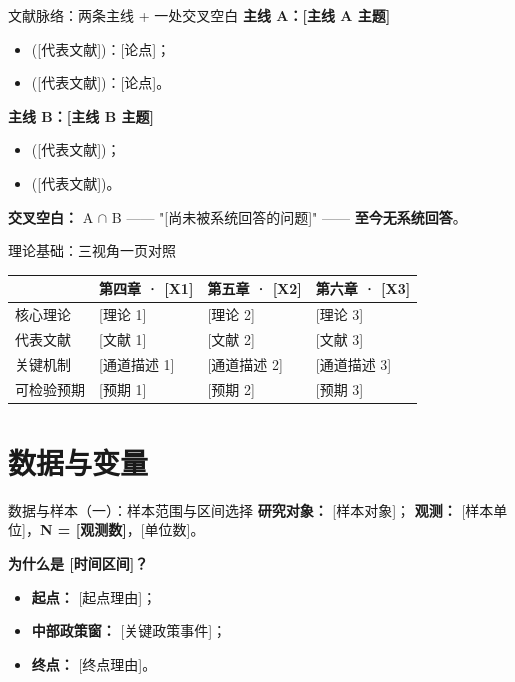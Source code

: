 \documentclass[10pt,aspectratio=169]{beamer}
\begin{document}
\begin{frame}{文献脉络：两条主线 + 一处交叉空白}
  \textbf{主线 A：[主线 A 主题]}
  \begin{itemize}
    \item [派别 1] ([代表文献])：[论点]；
    \item [派别 2] ([代表文献])：[论点]。
  \end{itemize}

  \vspace{0.3em}
  \textbf{主线 B：[主线 B 主题]}
  \begin{itemize}
    \item [路径 1] ([代表文献])；
    \item [路径 2] ([代表文献])。
  \end{itemize}

  \vspace{0.3em}
  \textbf{交叉空白：} A $\cap$ B —— "[尚未被系统回答的问题]" —— \textbf{至今无系统回答}。
\end{frame}

\begin{frame}{理论基础：三视角一页对照}
  \centering\scriptsize
  \setlength{\tabcolsep}{4pt}
  \begin{tabular}{p{1.8cm} p{3.1cm} p{3.1cm} p{3.1cm}}
    \toprule
              & \textbf{第四章 · [X1]} & \textbf{第五章 · [X2]} & \textbf{第六章 · [X3]} \\
    \midrule
    核心理论 & [理论 1]      & [理论 2]      & [理论 3]      \\
    代表文献 & [文献 1]      & [文献 2]      & [文献 3]      \\
    关键机制 & [通道描述 1]  & [通道描述 2]  & [通道描述 3]  \\
    可检验预期 & [预期 1]    & [预期 2]      & [预期 3]      \\
    \bottomrule
  \end{tabular}
\end{frame}

\section{数据与变量}

\begin{frame}{数据与样本（一）：样本范围与区间选择}
  \textbf{研究对象：} [样本对象]；\quad
  \textbf{观测：} [样本单位]，\textbf{N = [观测数]}，[单位数]。

  \vspace{0.4em}
  \textbf{为什么是 [时间区间]？}
  \begin{itemize}
    \item \textbf{起点：} [起点理由]；
    \item \textbf{中部政策窗：} [关键政策事件]；
    \item \textbf{终点：} [终点理由]。
  \end{itemize}
\end{frame}
\end{document}
